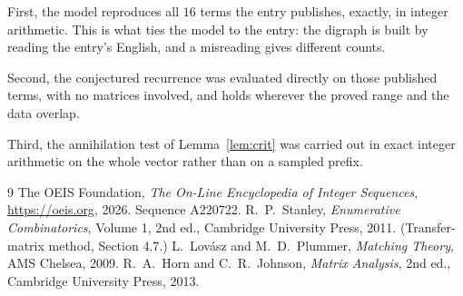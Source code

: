 \documentclass[11pt,a4paper]{article}
\theoremstyle{plain}
\theoremstyle{definition}
\begin{document}
First, the model reproduces all $16$ terms the entry publishes, exactly, in integer
arithmetic. This is what ties the model to the entry: the digraph is built by reading the
entry's English, and a misreading gives different counts.

Second, the conjectured recurrence was evaluated directly on those published terms, with no
matrices involved, and holds wherever the proved range and the data overlap.

Third, the annihilation test of Lemma~\ref{lem:crit} was carried out in exact integer
arithmetic on the whole vector rather than on a sampled prefix.

\begin{thebibliography}{9}
 The OEIS Foundation, \emph{The On-Line Encyclopedia of Integer
Sequences}, \url{https://oeis.org}, 2026. Sequence A220722.
 R.~P.~Stanley, \emph{Enumerative Combinatorics}, Volume 1, 2nd ed.,
Cambridge University Press, 2011. (Transfer-matrix method, Section 4.7.)
 L.~Lov\'asz and M.~D.~Plummer, \emph{Matching Theory}, AMS Chelsea,
2009.
 R.~A.~Horn and C.~R.~Johnson, \emph{Matrix Analysis}, 2nd ed., Cambridge
University Press, 2013.
\end{thebibliography}
\end{document}
